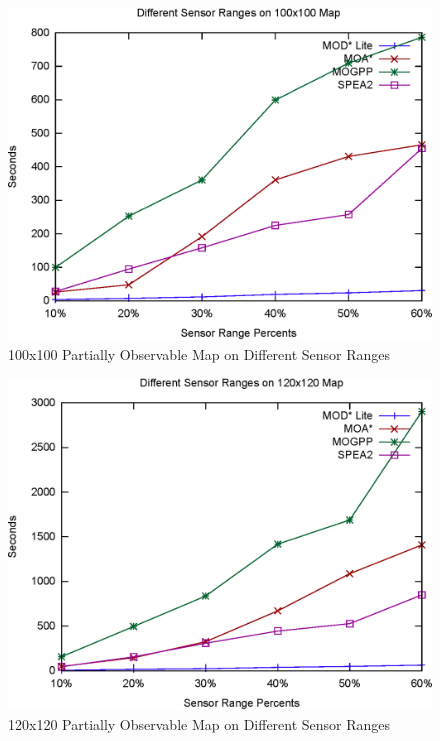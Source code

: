 \documentclass[10pt,journal]{IEEEtran}
\begin{document}
\begin{figure}
\centering
\includegraphics[scale=0.45]{experimental/100x100_partially}
\caption{100x100 Partially Observable Map on Different Sensor Ranges}
\label{fig:100x100sensor}
\end{figure}

\begin{figure}
\centering
\includegraphics[scale=0.45]{experimental/120x120_partially}
\caption{120x120 Partially Observable Map on Different Sensor Ranges}
\label{fig:120x120sensor}
\end{figure}

%
\end{document}
